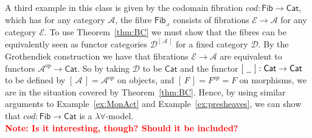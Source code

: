 \documentclass[a4paper,UKenglish]{lipics}
\newcommand\note[1]{{ \bf \textcolor{red} {\vspace{2mm}\; \\ Note: #1\\}}}
\newcommand{\ra}{\rightarrow}
\newcommand{\msf}[1]{\mathsf{#1}} %
\newcommand{\Set}{\msf{Set}}
\newcommand{\Cat}{\msf{Cat}}
\newcommand{\Fib}{\msf{Fib}}
\newcommand{\LAb}{\msf{L}_{\msf{Ab}}}
\newcommand{\terminal}{\msf{1}}
\newcommand{\A}{\mathcal{A}}
\newcommand{\D}{\mathcal{D}}
\newcommand{\E}{\mathcal{E}}
\newcommand{\fibre}[2]{#1_{_{#2}}}
\newcommand{\fibreE}[1]{\E_{_{#1}}}
\newcommand{\blank}{\, \underline{\hspace{2mm}} \,}
\newcommand{\SqFun}[1][\blank]{[\, #1 \, ]} %
\newcommand{\qnt}{\msf{quantity}}
\begin{document}
\begin{example}\label{ex:fibrations}
A third example in this class is given by the codomain fibration $cod: \Fib \rightarrow \Cat$, which has for any category $\A$, the fibre $\fibre{\Fib}{\A}$ consists of fibrations $\E \rightarrow \A$ for any category $\E$. To use Theorem~\ref{thm:BC} we must show that the fibres can be equivalently seen as functor categories $\mathcal{D}^{\SqFun[\A]}$ for a fixed category $\D$. By the Grothendiek construction we have that fibrations $\E \rightarrow \A$ are equivalent to functors $\A^{op} \rightarrow \Cat$. So by taking $\D$ to be $\Cat$ and the functor $\SqFun[\blank]:\Cat \rightarrow \Cat$ to be defined by $\SqFun[\A] = \A^{op}$ on objects, and $\SqFun[F] = F^{op} = F$ on morphisms, we are in the situation covered by Theorem~\ref{thm:BC}. Hence, by using similar arguments to Example~\ref{ex:MonAct} and Example~\ref{ex:presheaves}, we can show that $cod:\Fib \rightarrow \Cat$ is a $\lambda \forall$-model.
\note{Is it interesting, though? Should it be included?}
\end{example}



\end{document}
